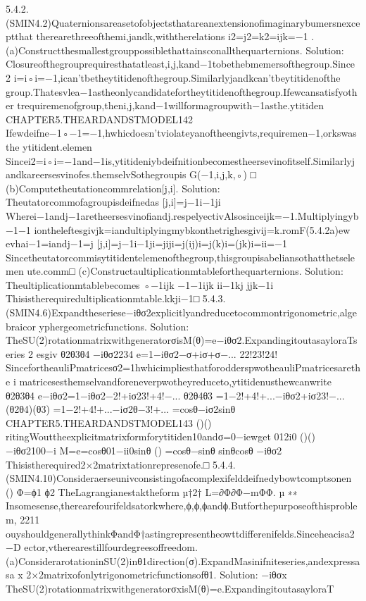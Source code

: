{{{{{{{{{{5.4.2.(SMIN4.2)Quaternionsareasetofobjectsthatareanextensionofimaginarybumersnexceptthat
therearethreeofthemi,jandk,withtherelations
i2=j2=k2=ijk=−1
.
(a)Constructthesmallestgrouppossiblethattainsconallthequarternions.
Solution:
Closureofthegrouprequiresthatatleast,i,j,kand−1tobethebmemersofthegroup.Since
2
i=i◦i=−1,ican’tbetheytitidenofthegroup.Similarlyjandkcan’tbeytitidenofthe
group.Thatesvlea−1astheonlycandidatefortheytitidenofthegroup.Ifewcansatisfyother
trequiremenofgroup,theni,j,kand−1willformagroupwith−1asthe.ytitiden
CHAPTER5.THEARDANDSTMODEL142
Ifewdeifne−1◦−1=−1,hwhicdoesn’tviolateyanoftheengivts,requiremen−1,orkswasthe
ytitident.elemen
Sincei2=i◦i=−1and−1is,ytitideniybdeifnitionbecomestheersevinofitself.Similarlyj
andkareersesvinofes.themselvSothegroupis
G({−1,i,j,k},◦)
□
(b)Computetheutationcommrelation[j,i].
Solution:
Theutatorcommofagroupisdeifnedas
[j,i]=j−1i−1ji
Wherei−1andj−1aretheersesvinofiandj.respelyectivAlsosinceijk=−1.Multiplyingyb
−1−1
iontheleftesgivjk=iandultiplyingmybkonthetrighesgivij=k.romF(5.4.2a)ew
evhai−1=iandj−1=j
[j,i]=j−1i−1ji=jiji=j(ij)i=j(k)i=(jk)i=ii=−1
Sincetheutatorcommisytitidentelemenofthegroup,thisgroupisabeliansothatthetselemen
ute.comm□
(c)Constructaultiplicationmtableforthequarternions.
Solution:
Theultiplicationmtablebecomes
◦−1ijk
−1−1ijk
ii−1kj
jjk−1i
Thisistherequiredultiplicationmtable.kkji−1□
5.4.3.(SMIN4.6)Expandtheseriese−iθσ2explicitlyandreducetocommontrigonometric,algebraicor
yphergeometricfunctions.
Solution:
TheSU(2)rotationmatrixwithgeneratorσisM(θ)=e−iθσ2.ExpandingitoutasayloraTseries
2
esgiv
θ2θ3θ4
−iθσ2234
e=1−iθσ2−σ+iσ+σ−...
22!23!24!
SincefortheauliPmatricesσ2=1hwhicimpliesthatforodderspwotheauliPmatricesarethe
i
matricesesthemselvandforeneverpwotheyreduceto,ytitidenusthewcanwrite
θ2θ3θ4
e−iθσ2=1−iθσ2−2!+iσ23!+4!−...
θ2θ4θ3
=1−2!+4!+...−iθσ2+iσ23!−...
(θ2θ4)(θ3)
=1−2!+4!+...−iσ2θ−3!+...
=cosθ−iσ2sinθ
CHAPTER5.THEARDANDSTMODEL143
()()
ritingWouttheexplicitmatrixformforytitiden10andσ=0−iewget
012i0
()()
−iθσ2100−i
M=e=cosθ01−ii0sinθ
()
=cosθ−sinθ
sinθcosθ
−iθσ2
Thisistherequired2×2matrixtationrepresenofe.□
5.4.4.(SMIN4.10)Consideraerseunivconsistingofacomplexifelddeifnedybowtcomptsonen
()
Φ=ϕ1
ϕ2
TheLagrangianestaktheform
µ†2†
L=∂Φ∂Φ−mΦΦ.
µ
∗∗
Insomesense,therearefourifeldsatorkwhere,ϕ,ϕ,ϕandϕ.Butforthepurposeofthisproblem,
2211
ouyshouldgenerallythinkΦandΦ†astingrepresentheowttdifferenifelds.Sinceheacisa2−D
ector,vtherearestillfourdegreesoffreedom.
(a)ConsiderarotationinSU(2)inθ1direction(σ).ExpandMasinifniteseries,andexpressasa
x
2×2matrixofonlytrigonometricfunctionsofθ1.
Solution:
−iθσx
TheSU(2)rotationmatrixwithgeneratorσxisM(θ)=e.ExpandingitoutasayloraT
}}}}}}}}}}
